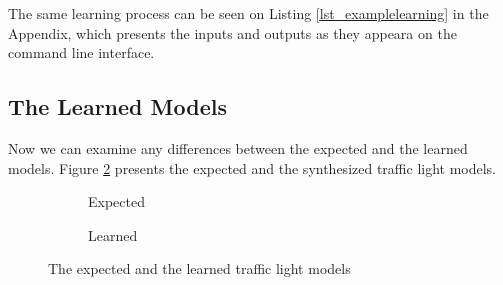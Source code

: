 \bigskip
The same learning process can be seen on Listing \ref{lst_examplelearning} in the Appendix, which presents the inputs and outputs as they appeara on the command line interface.

\subsection{The Learned Models} \label{subs_casestudyresults}

Now we can examine any differences between the expected and the learned models. Figure \ref{fig_casestudy_trafficlightdiff} presents the expected and the synthesized traffic light models.

\begin{figure}[!ht] 
	\centering
	\begin{subfigure}[b]{0.9\textwidth}
		\centering
		\caption{Expected}
	\end{subfigure}
	\hfill
	\begin{subfigure}[b]{0.9\textwidth}
		\centering
		\caption{Learned}	
		\label{fig_casestudy_trafficlightlearned}
	\end{subfigure}
	\caption{The expected and the learned traffic light models}
	\label{fig_casestudy_trafficlightdiff}
\end{figure}

